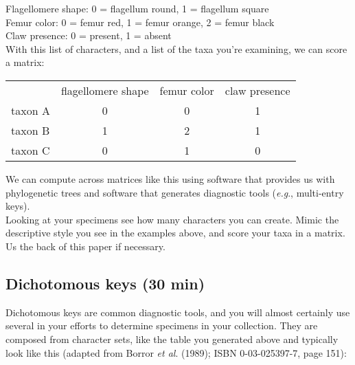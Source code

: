 \documentclass[letterpaper, 11pt]{article}
\begin{document}
Flagellomere shape:	0 = flagellum round, 1 = flagellum square\\

Femur color: 0 = femur red, 1 = femur orange, 2 = femur black\\

Claw presence: 0 = present, 1 = absent\\

With this list of characters, and a list of the taxa you're examining, we can score a matrix:
\begin{table}[H]
\centering
\label{my-label}
\begin{tabular}{lccc}
                             & \multicolumn{1}{l}{flagellomere shape} & \multicolumn{1}{l}{femur color} & \multicolumn{1}{l}{claw presence} \\ \cline{2-4} 
\multicolumn{1}{l|}{taxon A} & \multicolumn{1}{c|}{0}                 & \multicolumn{1}{c|}{0}          & \multicolumn{1}{c|}{1}            \\ \cline{2-4} 
\multicolumn{1}{l|}{taxon B} & \multicolumn{1}{c|}{1}                 & \multicolumn{1}{c|}{2}          & \multicolumn{1}{c|}{1}            \\ \cline{2-4} 
\multicolumn{1}{l|}{taxon C} & \multicolumn{1}{c|}{0}                 & \multicolumn{1}{c|}{1}          & \multicolumn{1}{c|}{0}            \\ \cline{2-4} 
\end{tabular}
\end{table}

\noindent{}We can compute across matrices like this using software that provides us with phylogenetic trees and software that generates diagnostic tools (\textit{e.g}., multi-entry keys).\\

\noindent{}Looking at your specimens see how many characters you can create. Mimic the descriptive style you see in the examples above, and score your taxa in a matrix. Us the back of this paper if necessary.\vspace{15cm}

\subsection{Dichotomous keys (30 min)}
Dichotomous keys are common diagnostic tools, and you will almost certainly use several in your efforts to determine specimens in your collection. They are composed from character sets, like the table you generated above and typically look like this (adapted from Borror \textit{et al}. (1989); ISBN 0-03-025397-7, page 151):\\
\end{document}
